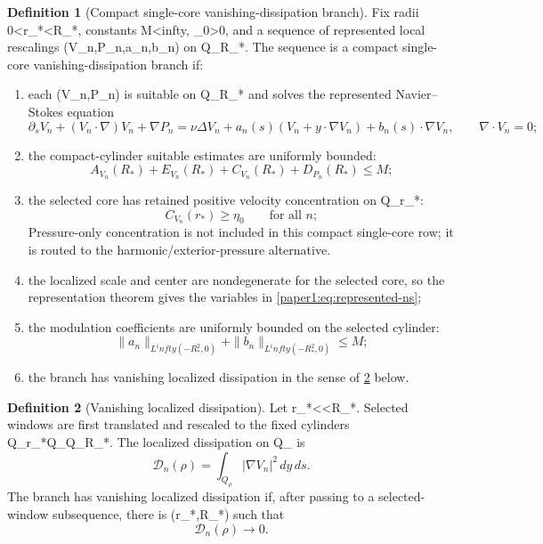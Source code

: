 \documentclass[11pt]{amsart}
\def\({}%
\def\){}%
\def\infty{infty}%
\theoremstyle{plain}
\theoremstyle{definition}
\newtheorem{definition}[definition]{Definition}
\theoremstyle{remark}
\begin{document}
\begin{definition}[Compact single-core vanishing-dissipation branch]\label{paper1:def:single-core-branch}
Fix radii \(0<r_*<R_*\), constants \(M<\infty\), \(\eta_0>0\), and a sequence
of represented local rescalings \((V_n,P_n,a_n,b_n)\) on \(Q_{R_*}\).  The
sequence is a compact single-core vanishing-dissipation branch if:
\begin{enumerate}[label=\textup{(\roman*)}]
\item each \((V_n,P_n)\) is suitable on \(Q_{R_*}\) and solves the represented
      Navier--Stokes equation
      \begin{equation}\label{paper1:eq:represented-ns}
      \partial_s V_n+(V_n\cdot\nabla)V_n+\nabla P_n
      =\nu\Delta V_n+a_n(s)(V_n+y\cdot\nabla V_n)+b_n(s)\cdot\nabla V_n,
      \qquad \nabla\cdot V_n=0;
      \end{equation}
\item the compact-cylinder suitable estimates are uniformly bounded:
      \[
      A_{V_n}(R_*)+E_{V_n}(R_*)+C_{V_n}(R_*)+D_{P_n}(R_*)\le M;
      \]
\item the selected core has retained positive velocity concentration on \(Q_{r_*}\):
      \[
      C_{V_n}(r_*)\ge\eta_0
      \qquad\text{for all }n;
      \]
      Pressure-only concentration is not included in this compact single-core
      row; it is routed to the harmonic/exterior-pressure alternative.
\item the localized scale and center are nondegenerate for the selected core,
      so the representation theorem gives the variables in
      \eqref{paper1:eq:represented-ns};
\item the modulation coefficients are uniformly bounded on the selected cylinder:
      \[
      \|a_n\|_{L^\infty(-R_*^2,0)}+\|b_n\|_{L^\infty(-R_*^2,0)}\le M;
      \]
\item the branch has vanishing localized dissipation in the sense of
      \cref{paper1:def:localized-dissipation} below.
\end{enumerate}
\end{definition}

\begin{definition}[Vanishing localized dissipation]\label{paper1:def:localized-dissipation}
Let \(r_*<\rho<R_*\).  Selected windows are first translated and rescaled to the
fixed cylinders \(Q_{r_*}\Subset Q_\rho\Subset Q_{R_*}\).  The localized
dissipation on \(Q_\rho\) is
\[
  \mathcal D_n(\rho)=\int_{Q_\rho}|\nabla V_n|^2\,dy\,ds.
\]
The branch has vanishing localized dissipation if, after passing to a
selected-window subsequence, there is \(\rho\in(r_*,R_*)\) such that
\[
  \mathcal D_n(\rho)\to0.
\]
\end{definition}
\end{document}
